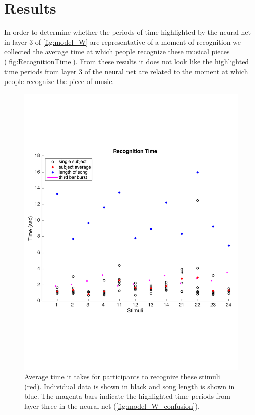 \section{Results}
In order to determine whether the periods of time highlighted by the neural net in layer 3 of \autoref{fig:model_W} are representative of a moment of recognition we collected the average time at which people recognize these musical pieces (\autoref{fig:RecognitionTime}). 
From these results it does not look like the highlighted time periods from layer 3 of the neural net are related to the moment at which people recognize the piece of music. 
\begin{figure}[h] 
  \begin{center}
        \includegraphics[scale=0.7]{Figures/RecognitionTimeGraph}
    \caption{Average time it takes for participants to recognize these stimuli (red). Individual data is shown in black and song length is shown in blue. The magenta bars indicate the highlighted time periods from layer three in the neural net (\autoref{fig:model_W_confusion}).}
    \label{fig:RecognitionTime}
  \end{center}
\end{figure}
